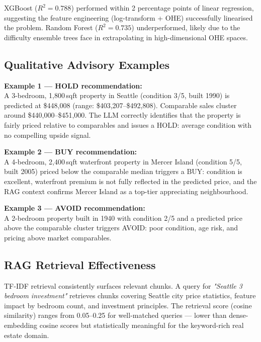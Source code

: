 \documentclass[12pt, a4paper]{article}
\begin{document}
XGBoost ($R^2 = 0.788$) performed within 2 percentage points of linear regression,
suggesting the feature engineering (log-transform + OHE) successfully linearised the
problem. Random Forest ($R^2 = 0.735$) underperformed, likely due to the difficulty
ensemble trees face in extrapolating in high-dimensional OHE spaces.

\subsection{Qualitative Advisory Examples}

\textbf{Example 1 --- HOLD recommendation:}\\
A 3-bedroom, 1,800\,sqft property in Seattle (condition 3/5, built 1990) is predicted
at \$448,008 (range: \$403,207--\$492,808). Comparable sales cluster around \$440,000--\$451,000.
The LLM correctly identifies that the property is fairly priced relative to comparables
and issues a HOLD: average condition with no compelling upside signal.

\textbf{Example 2 --- BUY recommendation:}\\
A 4-bedroom, 2,400\,sqft waterfront property in Mercer Island (condition 5/5, built 2005)
priced below the comparable median triggers a BUY: condition is excellent, waterfront
premium is not fully reflected in the predicted price, and the RAG context confirms
Mercer Island as a top-tier appreciating neighbourhood.

\textbf{Example 3 --- AVOID recommendation:}\\
A 2-bedroom property built in 1940 with condition 2/5 and a predicted price above the
comparable cluster triggers AVOID: poor condition, age risk, and pricing above market
comparables.

\subsection{RAG Retrieval Effectiveness}

TF-IDF retrieval consistently surfaces relevant chunks. A query for
\textit{"Seattle 3 bedroom investment"} retrieves chunks covering Seattle city price
statistics, feature impact by bedroom count, and investment principles. The retrieval
score (cosine similarity) ranges from 0.05--0.25 for well-matched queries --- lower
than dense-embedding cosine scores but statistically meaningful for the keyword-rich
real estate domain.

\end{document}
